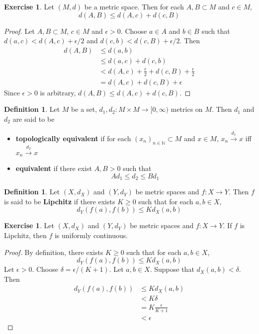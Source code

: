 \documentclass[12pt]{amsart}
\theoremstyle{definition}
\newtheorem{defn}[definition]{Definition}
\newtheorem{ex}[definition]{Exercise}
\newcommand{\del}{\delta}
\newcommand{\ep}{\epsilon}
\newcommand{\N}{\mathbb{N}}
\newcommand{\tbf}[1]{\textbf{#1}}
\newcommand{\Rg}{[0,\infty)}
\newcommand{\conv}[1]{\xrightarrow{#1}}
\DeclareMathOperator*{\0}{\mbf{0}}
\DeclareMathOperator*{\1}{\mbf{1}}
\newcommand{\lex}[1]{\label{ex:#1}}
\newcommand{\ld}[1]{\label{defn:#1}}
\begin{document}
	\begin{ex} \lex{}
	Let $(M,d)$ be a metric space. Then for each $A,B \subset M$ and $c \in M$, $$d(A,B) \leq d(A,c) + d(c, B)$$
	\end{ex}
	
	\begin{proof}
	Let $A,B \subset M$, $c \in M$ and $\ep>0$. Choose $a \in A$ and $b \in B$ such that $d(a,c) < d(A,c)+ \ep/2$ and  $d(c,b) < d(c,B)+ \ep/2$. Then 
	\begin{align*}
	d(A,B) 
	&\leq d(a,b) \\
	&\leq d(a,c) + d(c,b) \\
	&< d(A,c) + \frac{\ep}{2} + d(c,B) + \frac{\ep}{2} \\
	&= d(A,c) + d(c,B) + \ep
	\end{align*}
	Since $\ep >0$ is arbitrary, $d(A,B) \leq d(A,c) + d(c,B)$.
	\end{proof}
	
	\begin{defn} \ld{}
	Let $M$ be a set, $d_1, d_2: M \times M \rightarrow \Rg$ metrics on $M$. Then $d_1$ and $d_2$ are said to be 
	\begin{itemize}
	\item \tbf{topologically equivalent} if for each $(x_n)_{n \in \N} \subset M$ and $x \in M$, $x_n \conv{d_1} x$ iff $x_n \conv{d_2} x$ 
	\item\tbf{equivalent} if there exist $A, B > 0$ such that $$A d_1 \leq d_2 \leq B d_1$$
\end{itemize}		
	\end{defn}	
	
	\begin{defn} \ld{}
	Let $(X, d_X)$ and $(Y, d_Y)$ be metric spaces and $f: X \rightarrow Y$. Then $f$ is said to be \tbf{Lipchitz} if there exists $K \geq 0$ such that for each $a, b \in X$, $$d_Y(f(a), f(b)) \leq Kd_X(a,b)$$
	\end{defn}	
	
	\begin{ex} \lex{}
	Let $(X, d_X)$ and $(Y, d_Y)$ be metric spaces and $f: X \rightarrow Y$. If $f$ is Lipchitz, then $f$ is uniformly continuous.	
	\end{ex}
	
	\begin{proof}
	By definition, there exists $K \geq 0$ such that for each $a, b \in X$, $$d_Y(f(a), f(b)) \leq Kd_X(a,b)$$ Let $\ep >0$. Choose $\del = \ep / (K+1)$. Let $a, b \in X$. Suppose that $d_X(a,b) < \del$. Then 
	\begin{align*}
	d_Y(f(a), f(b)) 
	& \leq Kd_X(a,b) \\
	& < K \del \\
	&= K \frac{\ep}{K+1} \\
	&< \ep  
	\end{align*}
	\end{proof}
	
\end{document}
